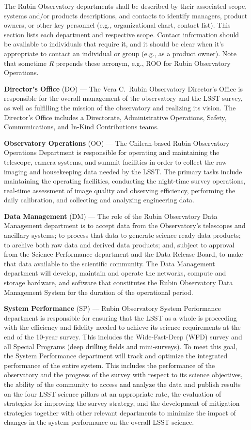 The Rubin Observatory departments shall be described by their associated scope, systems and/or products descriptions, and contacts to identify managers, product owners, or other key personnel (e.g., organizational chart, contact list).
This section lists each department and respective scope.
Contact information should be available to individuals that require it, and it should be clear when it's appropriate to contact an individual or group (e.g., as a product owner).
Note that sometime \emph{R} prepends these acronym, e.g., ROO for Rubin Observatory Operations.

\textbf{Director's Office} (DO) ---
The Vera C.\ Rubin Observatory Director's Office is responsible for the overall management of the observatory and the LSST survey, as well as fulfilling the mission of the observatory and realizing its vision.
The Director's Office includes a Directorate, Administrative Operations, Safety, Communications, and In-Kind Contributions teams.

\textbf{Observatory Operations} (OO) ---
The Chilean-based Rubin Observatory Operations Department is responsible for operating and maintaining the telescope, camera systems, and summit facilities in order to collect the raw imaging and housekeeping data needed by the LSST.
The primary tasks include maintaining the operating facilities, conducting the night-time survey operations, real-time assessment of image quality and observing efficiency, performing the daily calibration, and collecting and analyzing engineering data.

\textbf{Data Management} (DM) ---
The role of the Rubin Observatory Data Management department is to accept data from the Observatory's telescopes and ancillary systems; to process that data to generate science ready data products; to archive both raw data and derived data products; and, subject to approval from the Science Performance department and the Data Release Board, to make that data available to the scientific community.
The Data Management department will develop, maintain and operate the networks, compute and storage hardware, and software that constitutes the Rubin Observatory Data Management System for the duration of the operational period.

\textbf{System Performance} (SP) ---
Rubin Observatory System Performance department is responsible for ensuring that the LSST as a whole is proceeding with the efficiency and fidelity needed to achieve its science requirements at the end of the 10-year survey.
This includes the Wide-Fast-Deep (WFD) survey and all Special Programs (deep drilling fields and mini-surveys).
To meet this goal, the System Performance department will track and optimize the integrated performance of the entire system.
This includes the performance of the observatory and the progress of the survey with respect to its science objectives, the ability of the community to access and analyze the data and publish results on the four LSST science pillars at an appropriate rate, the evaluation of strategies for improving the survey strategy, and the development of mitigation strategies together with other relevant departments to minimize the impact of changes in the system performance on the overall LSST science.

